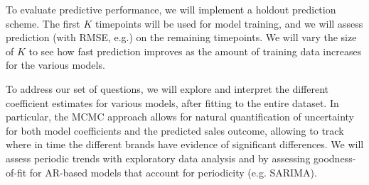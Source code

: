 \documentclass{article}
\begin{document}
To evaluate predictive performance, we will implement a holdout prediction scheme. The first $K$ timepoints will be used for model training, and we will assess prediction (with RMSE, e.g.) on the remaining timepoints. We will vary the size of $K$ to see how fast prediction improves as the amount of training data increases for the various models.

To address our set of questions, we will explore and interpret the different coefficient estimates for various models, after fitting to the entire dataset. In particular, the MCMC approach allows for natural quantification of uncertainty for both model coefficients and the predicted sales outcome, allowing to track where in time the different brands have evidence of significant differences. We will assess periodic trends with exploratory data analysis and by assessing goodness-of-fit for AR-based models that account for periodicity (e.g. SARIMA).





\end{document}
